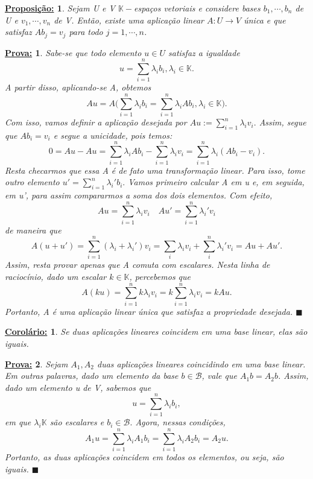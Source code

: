 \documentclass{article}
\newtheorem*{proposition*}{\underline{Proposi\c c\~ao:}}
\newtheorem*{corol*}{\underline{Corol\'ario:}}
\newtheorem*{proof*}{\underline{Prova:}}
\renewcommand\qedsymbol{$\blacksquare$}
\begin{document}
\begin{proposition*}
	Sejam U e V $\mathbb{K}-$espa\c cos vetoriais e considere bases $b_1, \cdots, b_n$ de U e $v_1, \cdots, v_n$ de V.
	Ent\~ao, existe uma aplica\c c\~ao linear $A:U \rightarrow V$ \'unica e que satisfaz $Ab_j = v_j$ para todo
	$j = 1, \cdots, n$.
\end{proposition*}
\begin{proof*}
	Sabe-se que todo elemento $u\in{U}$ satisfaz a igualdade
	$$
		u = \sum_{i=1}^{n}\lambda_ib_i, \lambda_i\in\mathbb{K}.
	$$
	A partir disso, aplicando-se A, obtemos
	$$
		Au = A\biggl(\sum_{i=1}^{n}\lambda_ib_i = \sum_{i=1}^{n}\lambda_iAb_i,  \lambda_i\in\mathbb{K}\biggr).
	$$
	Com isso, vamos definir a aplica\c c\~ao desejada por $Au:= \sum_{i=1}^{n}\lambda_iv_i.$ Assim, segue que
	$Ab_i = v_i$ e segue a unicidade, pois temos:
	$$
		0 = Au - Au = \sum_{i=1}^{n}\lambda_iAb_i - \sum_{i=1}^{n}\lambda_iv_i = \sum_{i=1}^{n}\lambda_i(Ab_i - v_i).
	$$
	Resta checarmos que essa A \'e de fato uma transforma\c c\~ao linear. Para isso, tome outro elemento $u' =
		\sum_{i=1}^{n}\lambda_i'b_i.$ Vamos primeiro calcular A em u e, em seguida, em u', para assim compararmos a soma
	dos dois elementos. Com efeito,
	$$
		Au = \sum_{i=1}^{n}\lambda_iv_i \quad Au' = \sum_{i=1}^{n}\lambda_i'v_i
	$$
	de maneira que
	$$
		A(u+u') = \sum_{i=1}^{n}(\lambda_i + \lambda_i')v_i = \sum_{i}\lambda_iv_i + \sum_{i}^{n}\lambda_i'v_i
		= Au + Au'.
	$$
	Assim, resta provar apenas que A comuta com escalares. Nesta linha de racioc\'inio, dado um escalar $k\in\mathbb{K}$,
	percebemos que
	$$
		A(ku) = \sum_{i=1}^{n}k\lambda_iv_i = k\sum_{i=1}^{n}\lambda_iv_i = kAu.
	$$
	Portanto, A \'e uma aplica\c c\~ao linear \'unica que satisfaz a propriedade desejada.
	\qedsymbol
\end{proof*}
\begin{corol*}
	Se duas aplica\c c\~oes lineares coincidem em uma base linear, elas s\~ao iguais.
\end{corol*}
\begin{proof*}
	Sejam $A_1, A_2$ duas aplica\c c\~oes lineares coincidindo em uma base linear. Em outras palavras, dado
	um elemento da base $b\in{\mathcal{B}}$, vale que $A_1b = A_2b$. Assim, dado um elemento u de V, sabemos que
	$$
		u = \sum_{i=1}^{n}\lambda_ib_i,
	$$
	em que $\lambda_i\mathbb{K}$ s\~ao escalares e $b_i\in\mathcal{B}.$ Agora, nessas condi\c c\~oes,
	$$
		A_1u = \sum_{i=1}^{n}\lambda_iA_1b_i = \sum_{i=1}^{n}\lambda_iA_2b_i = A_2u.
	$$
	Portanto, as duas aplica\c c\~oes coincidem em todos os elementos, ou seja, s\~ao iguais.
	\qedsymbol
\end{proof*}
\end{document}
